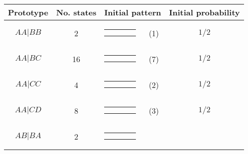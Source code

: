 \begin{center}
\begin{tabular}{ccrlc} \hline
Prototype & No. states & \multicolumn{2}{c}{Initial pattern} & Initial probability \\ \hline
$AA|BB$ & 2 & 
{\renewcommand{\arraystretch}{0.3}
\renewcommand{\tabcolsep}{0.5mm}
\parbox[b][3mm][c]{12mm}{
\begin{tabular}{|p{2mm}|p{2mm}||p{2mm}|p{2mm}|} \hline
$\bullet$ & $\circ  $ &           &           \\
$\bullet$ & $\circ  $ &           &           \\ \hline
\end{tabular}}}
& (1) & $1/2$ \\
$AA|BC$ & 16 & 
{\renewcommand{\arraystretch}{0.3}
\renewcommand{\tabcolsep}{0.5mm}
\parbox[b][3mm][c]{12mm}{
\begin{tabular}{|p{2mm}|p{2mm}||p{2mm}|p{2mm}|} \hline
$\bullet$ & $\circ  $ &           &           \\
$\bullet$ &           & $\circ  $ &           \\ \hline
\end{tabular}}}
& (7) & $1/2$ \\
$AA|CC$ & 4 & 
{\renewcommand{\arraystretch}{0.3}
\renewcommand{\tabcolsep}{0.5mm}
\parbox[b][3mm][c]{12mm}{
\begin{tabular}{|p{2mm}|p{2mm}||p{2mm}|p{2mm}|} \hline
$\bullet$ &           & $\circ  $ &           \\
$\bullet$ &           & $\circ  $ &           \\ \hline
\end{tabular}}}
& (2) & $1/2$ \\
$AA|CD$ & 8 & 
{\renewcommand{\arraystretch}{0.3}
\renewcommand{\tabcolsep}{0.5mm}
\parbox[b][3mm][c]{12mm}{
\begin{tabular}{|p{2mm}|p{2mm}||p{2mm}|p{2mm}|} \hline
$\bullet$ &           & $\circ  $ &           \\
$\bullet$ &           &           & $\circ  $ \\ \hline
\end{tabular}}}
& (3) & $1/2$ \\
$AB|BA$ & 2 & 
{\renewcommand{\arraystretch}{0.3}
\renewcommand{\tabcolsep}{0.5mm}
\parbox[b][3mm][c]{12mm}{
\begin{tabular}{|p{2mm}|p{2mm}||p{2mm}|p{2mm}|} \hline
$\bullet$ & $\circ  $ &           &           \\
$\circ  $ & $\bullet$ &           &           \\ \hline

\end{tabular}}}
\end{tabular}
\end{center}

